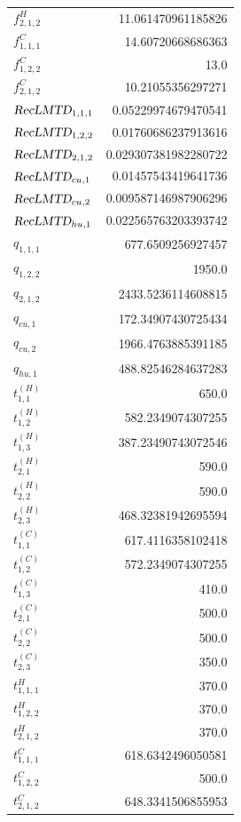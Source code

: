 \documentclass{article}%
\begin{document}
\begin{multicols*}{3}
\begin{supertabular}{lr}
	$f_{2,1,2}^{H}$ & 11.061470961185826 \\%
	$f_{1,1,1}^{C}$ & 14.60720668686363 \\%
	$f_{1,2,2}^{C}$ & 13.0 \\%
	$f_{2,1,2}^{C}$ & 10.21055356297271 \\%
	$\textsl{RecLMTD}_{1,1,1}$ & 0.05229974679470541 \\%
	$\textsl{RecLMTD}_{1,2,2}$ & 0.01760686237913616 \\%
	$\textsl{RecLMTD}_{2,1,2}$ & 0.029307381982280722 \\%
	$\textsl{RecLMTD}_{cu,1}$ & 0.01457543419641736 \\%
	$\textsl{RecLMTD}_{cu,2}$ & 0.009587146987906296 \\%
	$\textsl{RecLMTD}_{hu,1}$ & 0.022565763203393742 \\%
	$q_{1,1,1}$ & 677.6509256927457 \\%
	$q_{1,2,2}$ & 1950.0 \\%
	$q_{2,1,2}$ & 2433.5236114608815 \\%
	$q_{cu,1}$ & 172.34907430725434 \\%
	$q_{cu,2}$ & 1966.4763885391185 \\%
	$q_{hu,1}$ & 488.82546284637283 \\%
	$t_{1,1}^{(H)}$ & 650.0 \\%
	$t_{1,2}^{(H)}$ & 582.2349074307255 \\%
	$t_{1,3}^{(H)}$ & 387.23490743072546 \\%
	$t_{2,1}^{(H)}$ & 590.0 \\%
	$t_{2,2}^{(H)}$ & 590.0 \\%
	$t_{2,3}^{(H)}$ & 468.32381942695594 \\%
	$t_{1,1}^{(C)}$ & 617.4116358102418 \\%
	$t_{1,2}^{(C)}$ & 572.2349074307255 \\%
	$t_{1,3}^{(C)}$ & 410.0 \\%
	$t_{2,1}^{(C)}$ & 500.0 \\%
	$t_{2,2}^{(C)}$ & 500.0 \\%
	$t_{2,3}^{(C)}$ & 350.0 \\%
	$t_{1,1,1}^{H}$ & 370.0 \\%
	$t_{1,2,2}^{H}$ & 370.0 \\%
	$t_{2,1,2}^{H}$ & 370.0 \\%
	$t_{1,1,1}^{C}$ & 618.6342496050581 \\%
	$t_{1,2,2}^{C}$ & 500.0 \\%
	$t_{2,1,2}^{C}$ & 648.3341506855953 \\%

\end{supertabular}
\end{multicols*}
\end{document}
